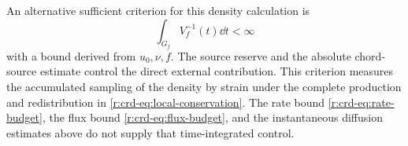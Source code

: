 An alternative sufficient criterion for this density calculation is
\[
 \int_{G_f}V_f^{-1}(t)\dd t<\infty
\]
with a bound derived from \(u_0,\nu,f\). The source reserve and the absolute
chord-source estimate control the direct external contribution.
This criterion measures the accumulated sampling of the density by strain
under the complete production and redistribution in
\eqref{r:crd-eq:local-conservation}. The rate bound
\eqref{r:crd-eq:rate-budget}, the flux bound \eqref{r:crd-eq:flux-budget},
and the instantaneous diffusion estimates above do not supply that
time-integrated control.
